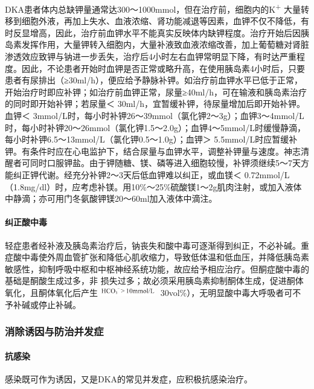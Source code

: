 DKA患者体内总缺钾量通常达300～1000mmol，但在治疗前，细胞内的K\textsuperscript{+}
大量转移到细胞外液，再加上失水、血液浓缩、肾功能减退等因素，血钾不仅不降低，有时反显增高，因此，治疗前血钾水平不能真实反映体内缺钾程度。治疗开始后因胰岛素发挥作用，大量钾转入细胞内，大量补液致血液浓缩改善，加上葡萄糖对肾脏渗透效应致钾与钠进一步丢失，治疗后4小时左右血钾常明显下降，有时达严重程度。因此，不论患者开始时血钾是否正常或略升高，在使用胰岛素4小时后，只要患者有尿排出（≥30ml/h），便应给予静脉补钾。如治疗前血钾水平已低于正常，开始治疗时即应补钾；如治疗前血钾正常，尿量≥40ml/h，可在输液和胰岛素治疗的同时即开始补钾；若尿量＜
30ml/h，宜暂缓补钾，待尿量增加后即开始补钾。血钾＜
3mmol/L时，每小时补钾26～39mmol（氯化钾2～3g）；血钾3～4mmol/L时，每小时补钾20～26mmol（氯化钾1.5～2.0g）；血钾4～5mmol/L时缓慢静滴，每小时补钾6.5～13mmol/L（氯化钾0.5～1.0g）；血钾＞
5.5mmol/L时应暂缓补钾。有条件时应在心电监护下，结合尿量与血钾水平，调整补钾量与速度。神志清醒者可同时口服钾盐。由于钾随糖、镁、磷等进入细胞较慢，补钾须继续5～7天方能纠正钾代谢。经充分补钾2～3天后低血钾难以纠正，或血镁＜
0.72mmol/L（1.8mg/dl）时，应考虑补镁。用10\%～25\%硫酸镁1～2g肌肉注射，或加入液体中静滴；亦可用门冬氨酸钾镁20～60ml加入液体中滴注。

\paragraph{纠正酸中毒}

轻症患者经补液及胰岛素治疗后，钠丧失和酸中毒可逐渐得到纠正，不必补碱。重症酸中毒使外周血管扩张和降低心肌收缩力，导致低体温和低血压，并降低胰岛素敏感性，抑制呼吸中枢和中枢神经系统功能，故应给予相应治疗。但酮症酸中毒的基础是酮酸生成过多，非{}
损失过多；故必须采用胰岛素抑制酮体生成，促进酮体氧化，且酮体氧化后产生\includegraphics[width=1.03125in,height=0.15625in]{./images/Image00170.jpg}
30vol\%），无明显酸中毒大呼吸者可不予补碱或停止补碱。

\subsubsection{消除诱因与防治并发症}

\paragraph{抗感染}

感染既可作为诱因，又是DKA的常见并发症，应积极抗感染治疗。

